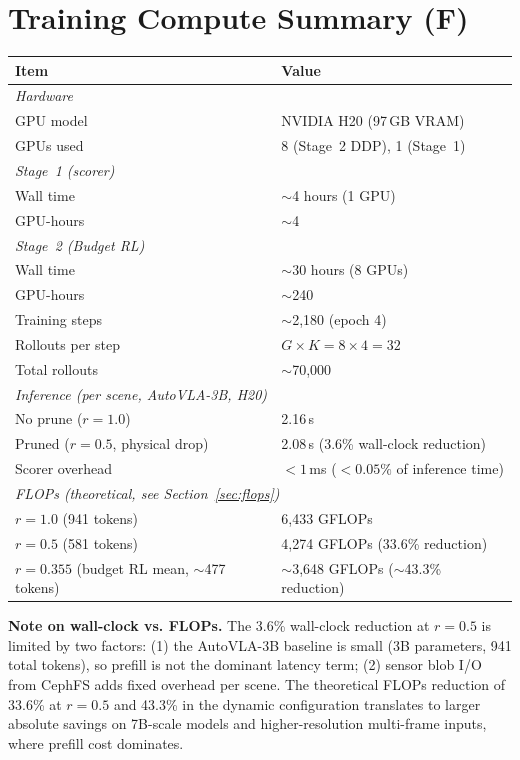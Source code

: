 \documentclass[letterpaper]{article}
\begin{document}
\section{Training Compute Summary (F)}
\label{sec:compute}

\begin{center}
\begin{tabular}{@{}ll@{}}
\toprule
Item & Value \\
\midrule
\multicolumn{2}{l}{\emph{Hardware}} \\
GPU model & NVIDIA H20 (97\,GB VRAM) \\
GPUs used & 8 (Stage~2 DDP), 1 (Stage~1) \\
\cmidrule(lr){1-2}
\multicolumn{2}{l}{\emph{Stage~1 (scorer)}} \\
Wall time & $\sim$4 hours (1 GPU) \\
GPU-hours & $\sim$4 \\
\cmidrule(lr){1-2}
\multicolumn{2}{l}{\emph{Stage~2 (Budget RL)}} \\
Wall time & $\sim$30 hours (8 GPUs) \\
GPU-hours & $\sim$240 \\
Training steps & $\sim$2,180 (epoch 4) \\
Rollouts per step & $G \times K = 8 \times 4 = 32$ \\
Total rollouts & $\sim$70,000 \\
\cmidrule(lr){1-2}
\multicolumn{2}{l}{\emph{Inference (per scene, AutoVLA-3B, H20)}} \\
No prune ($r{=}1.0$) & 2.16\,s \\
Pruned ($r{=}0.5$, physical drop) & 2.08\,s (3.6\% wall-clock reduction) \\
Scorer overhead & $<1$\,ms ($<0.05\%$ of inference time) \\
\cmidrule(lr){1-2}
\multicolumn{2}{l}{\emph{FLOPs (theoretical, see Section~\ref{sec:flops})}} \\
$r{=}1.0$ (941 tokens) & 6,433 GFLOPs \\
$r{=}0.5$ (581 tokens) & 4,274 GFLOPs (33.6\% reduction) \\
$r{=}0.355$ (budget RL mean, $\sim$477 tokens) & $\sim$3,648 GFLOPs ($\sim$43.3\% reduction) \\
\bottomrule
\end{tabular}
\end{center}

\textbf{Note on wall-clock vs. FLOPs.} The 3.6\% wall-clock reduction at $r{=}0.5$ is limited by
two factors: (1) the AutoVLA-3B baseline is small (3B parameters, 941 total tokens), so prefill is
not the dominant latency term; (2) sensor blob I/O from CephFS adds fixed overhead per scene. The
theoretical FLOPs reduction of 33.6\% at $r{=}0.5$ and 43.3\% in the dynamic configuration
translates to larger absolute savings on 7B-scale models and higher-resolution multi-frame inputs,
where prefill cost dominates.
\end{document}

